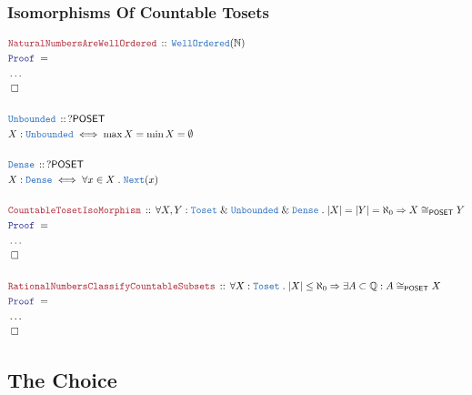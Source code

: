 \documentclass[12pt]{scrartcl}
\newcommand{\TYPE}[1]{\textcolor{NavyBlue}{\mathtt{#1}}}
\newcommand{\LOGIC}[1]{\textcolor{Blue}{\mathtt{#1}}}
\newcommand{\THM}[1]{\textcolor{Maroon}{\mathtt{#1}}}
\renewcommand{\.}{\; . \;}
\newcommand{\Theorem}[2]{& \THM{#1} \, :: \, #2 \\ & \Proof = \\ }
\newcommand{\DeclareType}[2]{& \TYPE{#1} \, :: \, #2 \\}
\newcommand{\DefineType}[3]{& #1 : \TYPE{#2} \iff #3 \\}
\newcommand{\Page}[1]{ \begin{align*} #1 \end{align*}   }
\newcommand{\NoProof}{ & \ldots \\ \EndProof}
\renewcommand{\And}{\; \& \;}
\newcommand{\Imply}{\Rightarrow}
\newcommand{\Rats}{\mathbb{Q} }
\newcommand{\Nat}{\mathbb{N} }
\newcommand{\QED}{\; \square}
\newcommand{\EndProof}{& \QED \\}
\newcommand{\Proof}{\LOGIC{Proof} \; }
\newcommand{\Toset}{\TYPE{Toset}}
\newcommand{\WO}{\TYPE{WellOrdered}}
\newcommand{\POSET}{\mathsf{POSET}}
\begin{document}
\subsubsection{Isomorphisms Of Countable Tosets}
\Page{
	\Theorem{NaturalNumbersAreWellOrdered}
	{
		\WO(\Nat)
	}
	\NoProof
	\\
	\DeclareType{Unbounded}{?\POSET}
	\DefineType{X}{Unbounded}{\max X = \min X = \emptyset}
	\\
	\DeclareType{Dense}{?\POSET}
	\DefineType{X}{Dense}{\forall x \in X \. \TYPE{Next}(x)}
	\\
	\Theorem{CountableTosetIsoMorphism}
	{
		\forall X,Y : \Toset \And \TYPE{Unbounded} \And \TYPE{Dense} \.
		|X| = |Y| = \aleph_0 \Imply X \cong_{\POSET} Y
	}
	\NoProof
	\\
	\Theorem{RationalNumbersClassifyCountableSubsets}
	{
		\forall X : \Toset \.
		|X| \le \aleph_0 \Imply
		\exists A \subset \Rats : 
		A \cong_{\POSET} X
	}
	\NoProof
}
\newpage
\subsection{The Choice}
\end{document}

